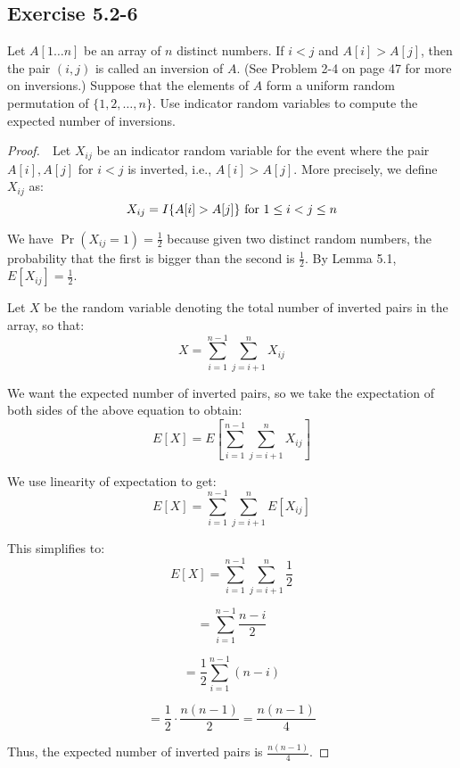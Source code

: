 \documentclass{article}
\begin{document}
\subsection*{Exercise 5.2-6}
Let $A[1 \ldots n]$ be an array of $n$ distinct numbers. If $i < j$ and $A[i] > A[j]$, 
then the pair $(i, j)$ is called an inversion of $A$. 
(See Problem 2-4 on page 47 for more on inversions.) 
Suppose that the elements of $A$ form a uniform random permutation of $\{1, 2, \ldots, n\}$. 
Use indicator random variables to compute the expected number of inversions.

\begin{proof}
    $ $\newline
    $ $\newline
    Let $X_{ij}$ be an indicator random variable for the event where the pair $A[i], A[j]$ for $i < j$ is inverted, i.e., $A[i] > A[j]$. 
    More precisely, we define $X_{ij}$ as:
    \[ X_{ij} = I\{A[i] > A[j]\} \text{ for } 1 \leq i < j \leq n \\
    \]
    
    We have $\Pr(X_{ij} = 1) = \frac{1}{2}$ because given two distinct random numbers, the probability that the first is bigger than the second is $\frac{1}{2}$. 
    By Lemma 5.1, $E[X_{ij}] = \frac{1}{2}$.
    
    Let $X$ be the random variable denoting the total number of inverted pairs in the array, so that:
    \[ X = \sum_{i=1}^{n-1} \sum_{j=i+1}^{n} X_{ij}
    \]
    
    We want the expected number of inverted pairs, so we take the expectation of both sides of the above equation to obtain:
    \[ E[X] = E\left[ \sum_{i=1}^{n-1} \sum_{j=i+1}^{n} X_{ij} \right]
    \]
    
    We use linearity of expectation to get:
    \[ E[X] = \sum_{i=1}^{n-1} \sum_{j=i+1}^{n} E[X_{ij}]
    \]
    
    This simplifies to:
    \[ E[X] = \sum_{i=1}^{n-1} \sum_{j=i+1}^{n} \frac{1}{2}
    \]
    
    \[     = \sum_{i=1}^{n-1} \frac{n - i}{2}
    \]
    
    \[     = \frac{1}{2} \sum_{i=1}^{n-1} (n - i)
    \]
    
    \[     = \frac{1}{2} \cdot \frac{n(n-1)}{2} = \frac{n(n-1)}{4}
    \]
    
    Thus, the expected number of inverted pairs is $\frac{n(n-1)}{4}$.
\end{proof}

\clearpage %
\end{document}

